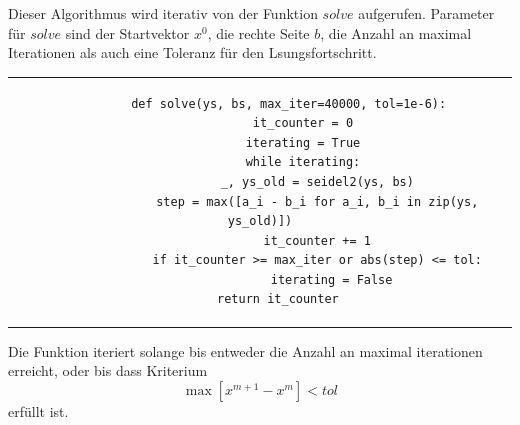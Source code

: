 \documentclass[12pt,titlepage]{article}
\begin{document}
		Dieser Algorithmus wird iterativ von der Funktion $solve$ aufgerufen. Parameter für $solve$ sind der Startvektor
		$x^0$, die rechte Seite $b$, die Anzahl an maximal Iterationen als auch eine Toleranz für den Lsungsfortschritt.
		\newline \newline
		\begin{tabular}{c}
		\begin{lstlisting}
		def solve(ys, bs, max_iter=40000, tol=1e-6):
    		it_counter = 0
    		iterating = True
   	 		while iterating:
        		_, ys_old = seidel2(ys, bs)
        		step = max([a_i - b_i for a_i, b_i in zip(ys, ys_old)])
        		it_counter += 1
        		if it_counter >= max_iter or abs(step) <= tol:
            		iterating = False
    		return it_counter		
	 	\end{lstlisting}
		\end{tabular}
		\newline \newline
		Die Funktion iteriert solange bis entweder die Anzahl an maximal iterationen erreicht, oder bis dass Kriterium
		\begin{equation*}
			\max [x^{m+1}-x^{m}] < tol
		\end{equation*}
		erfüllt ist.
		
\end{document}
